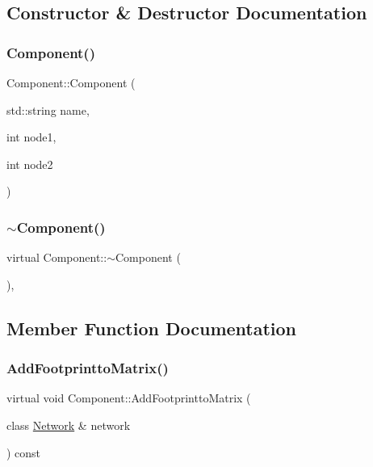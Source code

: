 \subsection{Constructor \& Destructor Documentation}
\mbox{\label{classComponent_a0af3b5b3c3463d6e617ec791900f4c6b}} 
\subsubsection{\texorpdfstring{Component()}{Component()}}
{\footnotesize\ttfamily Component\+::\+Component (\begin{DoxyParamCaption}\item[{std\+::string}]{name,  }\item[{int}]{node1,  }\item[{int}]{node2 }\end{DoxyParamCaption})\hspace{0.3cm}{\ttfamily [inline]}}

\mbox{\label{classComponent_ad82d7393e339c1b19cc17a0d55b5674d}} 
\subsubsection{\texorpdfstring{$\sim$\+Component()}{~Component()}}
{\footnotesize\ttfamily virtual Component\+::$\sim$\+Component (\begin{DoxyParamCaption}{ }\end{DoxyParamCaption})\hspace{0.3cm}{\ttfamily [virtual]}, {\ttfamily [default]}}



\subsection{Member Function Documentation}
\mbox{\label{classComponent_a833d40a0f50c3c06dcab2e035b758e6f}} 
\subsubsection{\texorpdfstring{Add\+Footprintto\+Matrix()}{AddFootprinttoMatrix()}}
{\footnotesize\ttfamily virtual void Component\+::\+Add\+Footprintto\+Matrix (\begin{DoxyParamCaption}\item[{class \hyperlink{classNetwork}{Network} \&}]{network }\end{DoxyParamCaption}) const\hspace{0.3cm}{\ttfamily [pure virtual]}}



